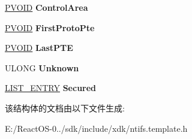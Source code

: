 \begin{DoxyCompactItemize}
\hyperlink{interfacevoid}{P\+V\+O\+ID} {\bfseries Control\+Area}
\item 
\mbox{\label{struct___v_a_d___h_e_a_d_e_r_ae4ca5b64f9a388c280b914becfc30cc8}} 
\hyperlink{interfacevoid}{P\+V\+O\+ID} {\bfseries First\+Proto\+Pte}
\item 
\mbox{\label{struct___v_a_d___h_e_a_d_e_r_a650f427dadb165c870e88c1c88d078fc}} 
\hyperlink{interfacevoid}{P\+V\+O\+ID} {\bfseries Last\+P\+TE}
\item 
\mbox{\label{struct___v_a_d___h_e_a_d_e_r_a372d6b39fcdb0a45debf5fc276823f8c}} 
U\+L\+O\+NG {\bfseries Unknown}
\item 
\mbox{\label{struct___v_a_d___h_e_a_d_e_r_ab6b5183e49ccbaefa6da67f7ec1d2d63}} 
\hyperlink{struct___l_i_s_t___e_n_t_r_y}{L\+I\+S\+T\+\_\+\+E\+N\+T\+RY} {\bfseries Secured}
\end{DoxyCompactItemize}


该结构体的文档由以下文件生成\+:\begin{DoxyCompactItemize}
\item 
E\+:/\+React\+O\+S-\/0../sdk/include/xdk/ntifs.\+template.\+h\end{DoxyCompactItemize}
